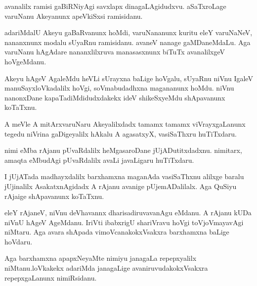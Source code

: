 \documentclass{article}
\begin{document}
\begin{mn}
avanalilx  ramisi  gaBiRNiyAgi  savxlapx  dinagaLAgidudxvu.  aSaTxroLage  varuNanu  Akeyanunx  apeVkiSxsi  ramisidanu.
\end{mn}

\begin{mn}
adariMdalU  Akeyu  gaBaRvanunx  hoMdi,  varuNananunx  kuritu  eleY  varuNaNeV,  nananxnunx  
modalu  sUyaRnu  ramisidanu.  avaneV  nanage  gaMDaneMdaLu.  Aga  varuNanu  hAgAdare  
nananxlilxruva  manasasxnunx  biTuTx  avanalilxgeV  hoVgeMdanu.
\end{mn}

\begin{mn}
Akeyu  hAgeV  AgaleMdu  heVLi  sUrayxna  baLige  hoVgalu,  sUyaRnu  niVnu  IgaleV  
manuSayxloVkadalilx  hoVgi,  soVmabudadhxna  magananunx  hoMdu.  niVnu  nanonxDane  
kapaTadiMdidudxdakekx  ideV  shikeSxyeMdu  shApavanunx  koTaTxnu.
\end{mn}

\begin{mn}
A meVle  A mitArxvaruNaru  Akeyalilxdadx  tamamx  tamamx viVrayxgaLanunx  tegedu  niVrina  
gaDigeyalilx  hAkalu  A  agasatxyX,  vasiSaThxru  huTiTxdaru.
\end{mn}

\begin{mn}
nimi  eMba  rAjanu  pUvaRdalilx  heMgasaroDane  jUjADutitxdadxnu.  nimitarx,  amaqta  
eMbudAgi  pUvaRdalilx  avaLi javaLigaru  huTiTxdaru.
\end{mn}

\begin{mn}
I  jUjATada  madhayxdalilx  barxhamxna  maganAda  vasiSaThxnu  alilxge  baralu  jUjinalilx  
AsakatxnAgidadx  A  rAjanu  avanige  pUjemADalilalx.  Aga  QuSiyu  rAjaige  shApavanunx  koTaTxnu.
\end{mn}

\begin{mn}
eleY  rAjaneV,  niVnu  deVhavannx  dharisadiruvavanAgu  eMdanu.  A  rAjanu  kUDa  niVnU  
hAgeV  AgeMdanu.  IriVti  ibabxrigU  shariVravu  hoVgi  toVjoVmayavAgi  niMtaru.  Aga  
avara  shApada  vimoVcanakokxVsakxra  barxhamxna  baLige  hoVdaru.
\end{mn}

\begin{mn}
Aga  barxhamxna  apapxNeyaMte  nimiyu  janagaLa  repepxyalilx  niMtanu.loVkakekx  
adariMda  janagaLige  avaniruvudakokxVsakxra  repepxgaLanunx  nimiRsidanu.
\end{mn}
\end{document}
